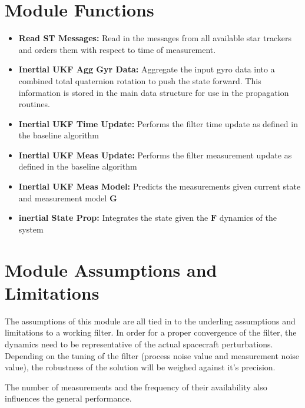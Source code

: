 

\section{Module Functions}

\begin{itemize}
    \item \textbf{Read ST Messages: } Read in the messages from all available star trackers and orders them with respect to time of measurement. 
    \item \textbf{Inertial UKF Agg Gyr Data: } Aggregate the input gyro data into a combined total quaternion 
    rotation to push the state forward.  This information is stored in the 
    main data structure for use in the propagation routines.
    \item \textbf{Inertial UKF Time Update: } Performs the filter time update as defined in the baseline algorithm
    \item \textbf{Inertial UKF Meas Update: } Performs the filter measurement update as defined in the baseline algorithm
    \item \textbf{Inertial UKF Meas Model: } Predicts the measurements given current state and measurement model $\bm G$
    \item \textbf{inertial State Prop: } Integrates the state given the $\bm F$ dynamics of the system
    \end{itemize}

\section{Module Assumptions and Limitations}

The assumptions of this module are all tied in to the underling assumptions and limitations to a working filter. 
In order for a proper convergence of the filter, the dynamics need to be representative of the actual spacecraft perturbations.
Depending on the tuning of the filter (process noise value and measurement noise value), the robustness of the solution will be weighed against it's precision. 

The number of measurements and the frequency of their availability also influences the general performance. 

